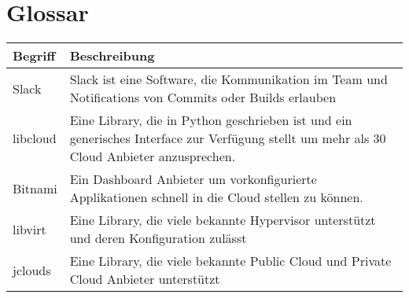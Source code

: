

\chapter{Glossar}


\begin{tabularx}{\linewidth}{l | X}
    \textbf{Begriff} & \textbf{Beschreibung}\\
    \hline
     Slack &  Slack ist eine Software, die Kommunikation im Team und Notifications von 
     Commits oder Builds erlauben\\
    \hline
    libcloud & Eine Library, die in Python geschrieben ist und ein generisches 
    Interface zur Verfügung stellt um mehr als 30 Cloud Anbieter anzusprechen.\\
    \hline
    Bitnami & Ein Dashboard Anbieter um vorkonfigurierte Applikationen schnell in die Cloud 
    stellen zu können.\\
    \hline
    libvirt & Eine Library, die viele bekannte Hypervisor unterstützt und deren 
    Konfiguration zulässt\\
    \hline
    jclouds & Eine Library, die viele bekannte Public Cloud und Private Cloud Anbieter unterstützt\\
    \hline
\end{tabularx}

